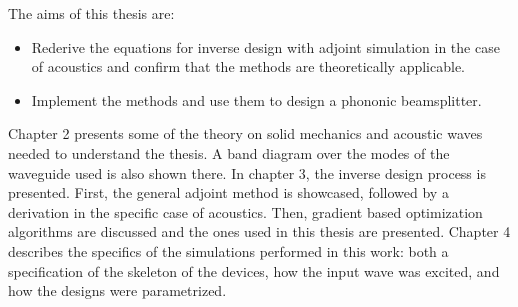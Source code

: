 The aims of this thesis are:
\begin{itemize}
	\item Rederive the equations for inverse design with adjoint simulation in
		the case of acoustics and confirm that the methods are theoretically
		applicable.
	\item Implement the methods and use them to design a phononic beamsplitter.
\end{itemize}

Chapter 2 presents some of the theory on solid mechanics and acoustic waves needed to
understand the thesis.
A band diagram over the modes of the waveguide used is also shown there.
In chapter 3, the inverse design process is presented. First, the general
adjoint method is showcased, followed by a derivation in the specific case of
acoustics.
Then, gradient based optimization algorithms are discussed and the ones used in
this thesis are presented.
Chapter 4 describes the specifics of the simulations performed in this work:
both a specification of the skeleton of the devices, how the input wave was excited,
and how the designs were parametrized.

